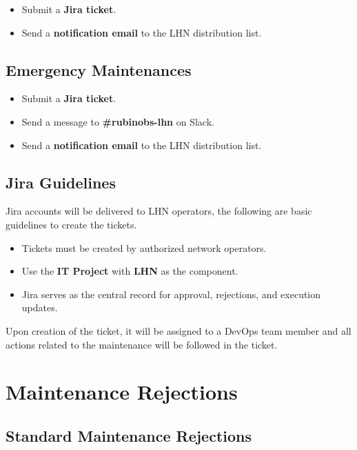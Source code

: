 \begin{itemize}[label=--]
  \item Submit a \textbf{Jira ticket}.
  \item Send a \textbf{notification email} to the LHN distribution list.
\end{itemize}

\subsection{Emergency Maintenances}

\begin{itemize}[label=--]
  \item Submit a \textbf{Jira ticket}.
  \item Send a message to \textbf{\#rubinobs-lhn} on Slack.
  \item Send a \textbf{notification email} to the LHN distribution list.
\end{itemize}

\subsection{Jira Guidelines}

Jira accounts will be delivered to LHN operators, the following are basic guidelines to create the tickets. 

\begin{itemize}[label=--]
  \item Tickets must be created by authorized network operators.
  \item Use the \textbf{IT Project} with \textbf{LHN} as the component.
  \item Jira serves as the central record for approval, rejections, and execution updates.
\end{itemize}

Upon creation of the ticket, it will be assigned to a DevOps team member and all actions related to the maintenance will be followed in the ticket. 

\section{Maintenance Rejections}

\subsection{Standard Maintenance Rejections}

